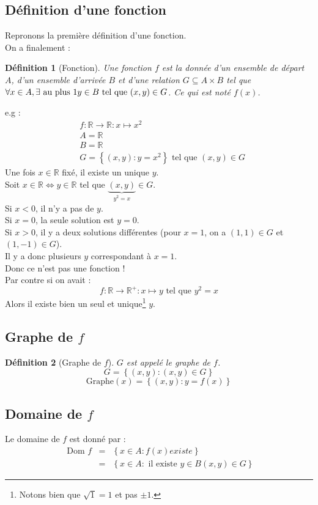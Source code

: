 \documentclass[a4paper,10pt]{report}
\newtheorem{de}{Définition}
\newcommand{\dom}{\mbox{ Dom }}
\begin{document}
\subsection{Définition d'une fonction}
Repronons la première définition d'une fonction.\\
On a finalement :
\begin{de}[Fonction]
Une fonction $f$ est la donnée d'un ensemble de départ $A$, d'un ensemble d'arrivée $B$ et d'une relation $G \subseteq A \times B$ tel que $\forall x \in A, \exists \mbox{ au plus } 1 \medskip y\in B \mbox{ tel que } (x,y)\in G$. Ce qui est noté $f(x)$.
\end{de}
e.g :
\begin{eqnarray*}
& f : \mathbb{R} \rightarrow \mathbb{R} : x \mapsto x^2\\
& A = \mathbb{R}\\
& B = \mathbb{R}\\
& G = \left\lbrace (x,y) : y = x^2\right\rbrace \mbox{ tel que } (x,y)\in G
\end{eqnarray*}
Une fois $x \in \mathbb{R}$ fixé, il existe un unique $y$.\\
Soit $x \in \mathbb{R} \Leftrightarrow y\in \mathbb{R}$ tel que $\underbrace{(x,y)}_{y^2=x} \in G$.\\
Si $x < 0$, il n'y a pas de $y$.\\
Si $x = 0$, la seule solution est $y=0$.\\
Si $x > 0$, il y a deux solutions différentes (pour $x=1$, on a $(1,1)\in G$ et $(1,-1) \in G$).\\
Il y a donc plusieurs $y$ correspondant à $x=1$.\\
Donc ce n'est pas une fonction !\\
Par contre si on avait :
$$f :\mathbb{R} \rightarrow \mathbb{R}^{+} : x \mapsto y \mbox{ tel que } y^2=x$$
Alors il existe bien un seul et unique\footnote{Notons bien que $\sqrt{1} = 1$ et pas $\pm 1$.} $y$.
\subsection{Graphe de $f$}
\begin{de}[Graphe de $f$]
$G$ est appelé le graphe de $f$.
$$G=\left\lbrace (x,y) : (x,y) \in G \right\rbrace$$
$$\mbox{Graphe}(x)=\left\lbrace (x,y) : y = f(x) \right\rbrace$$
\end{de}
\subsection{Domaine de $f$}
Le domaine de $f$ est donné par :
\begin{eqnarray*}
\dom f & = &\left\lbrace x \in A : f(x) existe \right\rbrace\\
& = & \left\lbrace x \in A : \mbox{ il existe } y\in B (x,y)\in G\right\rbrace
\end{eqnarray*}
\end{document}
